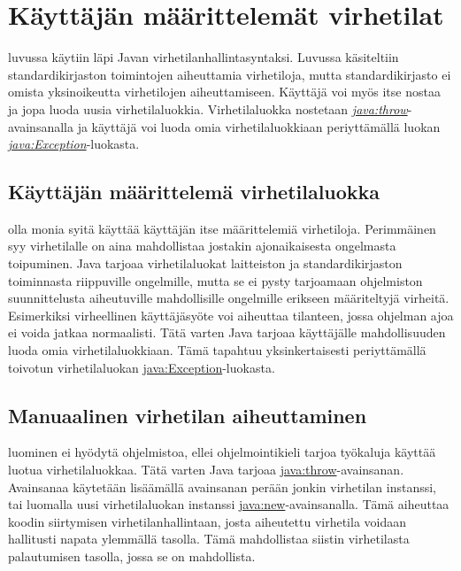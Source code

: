\documentclass{tufte-book}
\newcommand{\java}[1]{\underline{\gls{java:#1}}}
\newcommand{\newjava}[1]{\textit{\java{#1}}}
\begin{document}

\section{Käyttäjän määrittelemät virhetilat}
\label{exception}

 luvussa  käytiin läpi Javan
virhetilanhallintasyntaksi. Luvussa käsiteltiin standardikirjaston toimintojen aiheuttamia
virhetiloja, mutta standardikirjasto ei omista yksinoikeutta virhetilojen aiheuttamiseen. Käyttäjä
voi myös itse nostaa ja jopa luoda uusia virhetilaluokkia. Virhetilaluokka nostetaan
\newjava{throw}-avainsanalla ja käyttäjä voi luoda omia virhetilaluokkiaan periyttämällä luokan
\newjava{Exception}-luokasta.

\subsection{Käyttäjän määrittelemä virhetilaluokka}
\label{exception}

 olla monia syitä käyttää käyttäjän itse määrittelemiä virhetiloja.
Perimmäinen syy virhetilalle on aina mahdollistaa jostakin ajonaikaisesta ongelmasta toipuminen.
Java tarjoaa virhetilaluokat laitteiston ja standardikirjaston toiminnasta riippuville ongelmille,
mutta se ei pysty tarjoamaan ohjelmiston suunnittelusta aiheutuville mahdollisille ongelmille
erikseen määriteltyjä virheitä. Esimerkiksi virheellinen käyttäjäsyöte voi aiheuttaa tilanteen,
jossa ohjelman ajoa ei voida jatkaa normaalisti. Tätä varten Java tarjoaa käyttäjälle
mahdollisuuden luoda omia virhetilaluokkiaan. Tämä tapahtuu yksinkertaisesti periyttämällä
toivotun virhetilaluokan \java{Exception}-luokasta.

\subsection{Manuaalinen virhetilan aiheuttaminen}
\label{throws}

 luominen ei hyödytä ohjelmistoa, ellei ohjelmointikieli tarjoa
työkaluja käyttää luotua virhetilaluokkaa. Tätä varten Java tarjoaa \java{throw}-avainsanan.
Avainsanaa käytetään lisäämällä avainsanan perään jonkin virhetilan instanssi, tai luomalla uusi
virhetilaluokan instanssi \java{new}-avainsanalla. Tämä aiheuttaa koodin siirtymisen
virhetilanhallintaan, josta aiheutettu virhetila voidaan hallitusti napata ylemmällä tasolla. Tämä
mahdollistaa siistin virhetilasta palautumisen tasolla, jossa se on mahdollista. 
\end{document}
